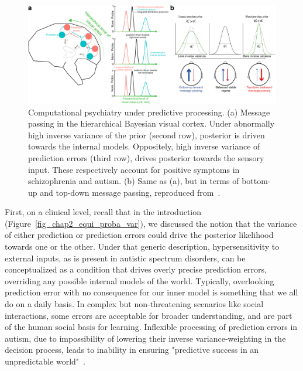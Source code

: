 \begin{figure}[h!tbp]
\vspace{0.1cm}
\centering
\includegraphics[width=1.\textwidth]{fig/fig_chap8_autism_schizo.pdf}
\caption[Message passing and computational psychiatry.]{Computational psychiatry under predictive processing.
(a) Message passing in the hierarchical Bayesian visual cortex. Under abnormally high inverse variance of the prior (second row), posterior is driven towards the internal models. Oppositely, high inverse variance of prediction errors (third row), drives posterior towards the sensory input. These respectively account for positive symptoms in schizophrenia and autism. 
(b) Same as (a), but in terms of bottom-up and top-down message passing, reproduced from~\cite{alamia2023oscillatory}.}
\label{fig_chap8_autism_schizo}
\end{figure} %

First, on a clinical level, recall that in the introduction (Figure~\ref{fig_chap2_equi_proba_var}), we discussed the notion that the variance of either prediction or prediction errors could drive the posterior likelihood towards one or the other. Under that generic description, hypersensitivity to external inputs, as is present in autistic spectrum disorders, can be conceptualized as a condition that drives overly precise prediction errors, overriding any possible internal models of the world. Typically, overlooking prediction error with no consequence for our inner model is something that we all do on a daily basis. In complex but non-threatening scenarios like social interactions, some errors are acceptable for broader understanding, and are part of the human social basis for learning. Inflexible processing of prediction errors in autism, due to impossibility of lowering their inverse variance-weighting in the decision process, leads to inability in ensuring "predictive success in an unpredictable world"~\cite{van2014precise}.


